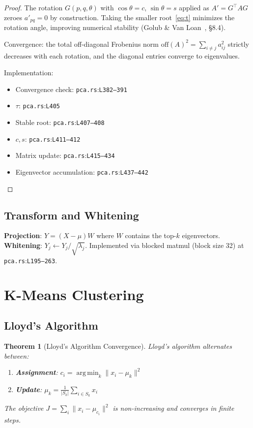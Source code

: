 \documentclass[11pt,a4paper]{article}
\newtheorem{theorem}{Theorem}[section]
\theoremstyle{remark}
\newcommand{\coderef}[2]{\texttt{#1}:\texttt{L#2}}
\newcommand{\argmin}{\operatorname*{arg\,min}}
\begin{document}
\begin{proof}
The rotation $G(p,q,\theta)$ with $\cos\theta = c$, $\sin\theta = s$ applied
as $A' = G^\top A G$ zeroes $a'_{pq} = 0$ by construction.  Taking the smaller
root~\eqref{eq:t} minimizes the rotation angle, improving numerical stability
(Golub \& Van Loan~\cite{golub2013}, \S8.4).

Convergence: the total off-diagonal Frobenius norm $\text{off}(A)^2 = \sum_{i \neq j} a_{ij}^2$
strictly decreases with each rotation, and the diagonal entries converge to
eigenvalues.

Implementation:
\begin{itemize}
  \item Convergence check: \coderef{pca.rs}{382--391}
  \item $\tau$: \coderef{pca.rs}{405}
  \item Stable root: \coderef{pca.rs}{407--408}
  \item $c, s$: \coderef{pca.rs}{411--412}
  \item Matrix update: \coderef{pca.rs}{415--434}
  \item Eigenvector accumulation: \coderef{pca.rs}{437--442}
\end{itemize}
\end{proof}

\subsection{Transform and Whitening}

\textbf{Projection}: $Y = (X - \mu)W$ where $W$ contains the top-$k$
eigenvectors.  \textbf{Whitening}: $Y_j \leftarrow Y_j / \sqrt{\lambda_j}$.
Implemented via blocked matmul (block size 32) at \coderef{pca.rs}{195--263}. \checkmark

\section{K-Means Clustering}
\label{sec:kmeans}

\subsection{Lloyd's Algorithm}

\begin{theorem}[Lloyd's Algorithm Convergence]
\label{thm:lloyd}
Lloyd's algorithm alternates between:
\begin{enumerate}[nosep]
  \item \textbf{Assignment}: $c_i = \argmin_k \|x_i - \mu_k\|^2$
  \item \textbf{Update}: $\mu_k = \frac{1}{|S_k|}\sum_{i \in S_k} x_i$
\end{enumerate}
The objective $J = \sum_{i} \|x_i - \mu_{c_i}\|^2$ is non-increasing and
converges in finite steps.
\end{theorem}
\end{document}
